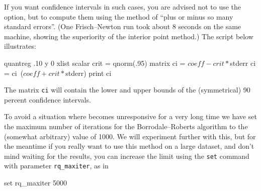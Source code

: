 If you want confidence intervals in such cases, you are advised not to
use the  option, but to compute them using the
method of ``plus or minus so many standard errors''.  (One
Frisch--Newton run took about 8 seconds on the same machine, showing
the superiority of the interior point method.)  The script below
illustrates:
%
\begin{code}
quantreg .10 y 0 xlist
scalar crit = qnorm(.95)
matrix ci = $coeff - crit * $stderr
ci = ci~($coeff + crit * $stderr)
print ci
\end{code}
%
The matrix \texttt{ci} will contain the lower and upper bounds of the
(symmetrical) 90 percent confidence intervals.

To avoid a situation where  becomes unresponsive for a very
long time we have set the maximum number of iterations for the
Borrodale--Roberts algorithm to the (somewhat arbitrary) value of
1000.  We will experiment further with this, but for the meantime if
you really want to use this method on a large dataset, and don't mind
waiting for the results, you can increase the limit using the
\texttt{set} command with parameter \verb|rq_maxiter|, as in
\begin{code}
set rq_maxiter 5000
\end{code}












